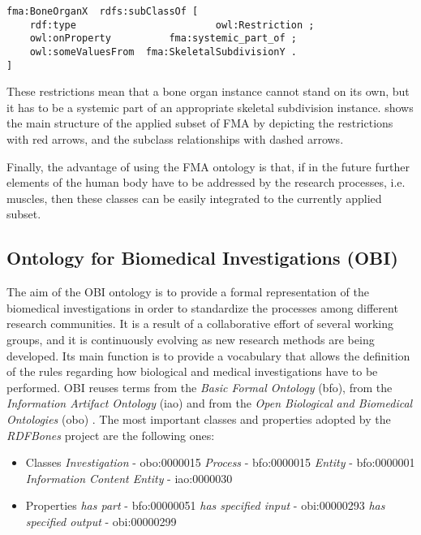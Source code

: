 \begin{lstlisting}[captionpos=b, caption=Rules of the skeletal system defined in OWL, label=fmaOWL, belowskip=1em, aboveskip=2em,
basicstyle=\footnotesize,frame=single]
fma:BoneOrganX	rdfs:subClassOf [
	rdf:type						owl:Restriction ;
	owl:onProperty			fma:systemic_part_of ;
	owl:someValuesFrom	fma:SkeletalSubdivisionY .
]
\end{lstlisting}

These restrictions mean that a bone organ instance cannot stand on its own, but it has to be a systemic part of an appropriate skeletal subdivision instance.  shows the main structure of the applied subset of FMA by depicting the restrictions with red arrows, and the subclass relationships with dashed arrows.


Finally, the advantage of using the FMA ontology is that, if in the future further elements of the human body have to be addressed by the research processes, i.e. muscles, then these classes can be easily integrated to the currently applied subset.

\subsection{Ontology for Biomedical Investigations (OBI)} \label{obi}

The aim of the OBI ontology is to provide a formal representation of the biomedical investigations in order to standardize the processes among different research communities. It is a result of a collaborative effort of several working groups, and it is continuously evolving as new research methods are being developed. Its main function is to provide a vocabulary that allows the definition of the rules regarding how biological and medical investigations have to be performed. OBI reuses terms from the  \textit{Basic Formal Ontology} (bfo), from the \textit{Information Artifact Ontology} (iao) and from the \textit{Open Biological and Biomedical Ontologies} (obo) \cite{10.1371/journal.pone.0154556}. The most important classes and properties adopted by the \textit{RDFBones} project are the following ones:

\begin{itemize}
	\item{Classes}
	\subitem  \textit{Investigation} - obo:0000015
	\subitem  \textit{Process} - bfo:0000015
	\subitem  \textit{Entity} - bfo:0000001
	\subitem  \textit{Information Content Entity} - iao:0000030
	\item{Properties}
	\subitem  \textit{has part} - bfo:00000051
	\subitem  \textit{has specified input} - obi:00000293
	\subitem  \textit{has specified output} - obi:00000299
\end{itemize}

